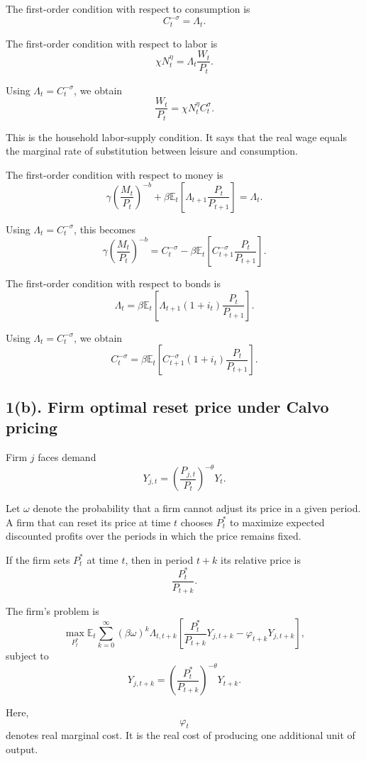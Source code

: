 \documentclass[12pt]{article}
\begin{document}
The first-order condition with respect to consumption is
\[
C_t^{-\sigma}=\Lambda_t.
\]

The first-order condition with respect to labor is
\[
\chi N_t^\eta
=
\Lambda_t\frac{W_t}{P_t}.
\]

Using $\Lambda_t=C_t^{-\sigma}$, we obtain
\[
\boxed{
\frac{W_t}{P_t}
=
\chi N_t^\eta C_t^\sigma.
}
\]

This is the household labor-supply condition. It says that the real wage equals the marginal rate of substitution between leisure and consumption.

The first-order condition with respect to money is
\[
\gamma
\left(
\frac{M_t}{P_t}
\right)^{-b}
+
\beta\mathbb{E}_t
\left[
\Lambda_{t+1}
\frac{P_t}{P_{t+1}}
\right]
=
\Lambda_t.
\]

Using $\Lambda_t=C_t^{-\sigma}$, this becomes
\[
\boxed{
\gamma
\left(
\frac{M_t}{P_t}
\right)^{-b}
=
C_t^{-\sigma}
-
\beta\mathbb{E}_t
\left[
C_{t+1}^{-\sigma}
\frac{P_t}{P_{t+1}}
\right].
}
\]

The first-order condition with respect to bonds is
\[
\Lambda_t
=
\beta\mathbb{E}_t
\left[
\Lambda_{t+1}
(1+i_t)
\frac{P_t}{P_{t+1}}
\right].
\]

Using $\Lambda_t=C_t^{-\sigma}$, we obtain
\[
\boxed{
C_t^{-\sigma}
=
\beta\mathbb{E}_t
\left[
C_{t+1}^{-\sigma}
(1+i_t)
\frac{P_t}{P_{t+1}}
\right].
}
\]

\subsection*{1(b). Firm optimal reset price under Calvo pricing}

Firm $j$ faces demand
\[
Y_{j,t}
=
\left(
\frac{P_{j,t}}{P_t}
\right)^{-\theta}
Y_t.
\]

Let $\omega$ denote the probability that a firm cannot adjust its price in a given period. A firm that can reset its price at time $t$ chooses $P_t^*$ to maximize expected discounted profits over the periods in which the price remains fixed.

If the firm sets $P_t^*$ at time $t$, then in period $t+k$ its relative price is
\[
\frac{P_t^*}{P_{t+k}}.
\]

The firm's problem is
\[
\max_{P_t^*}
\mathbb{E}_t
\sum_{k=0}^{\infty}
(\beta\omega)^k
\Lambda_{t,t+k}
\left[
\frac{P_t^*}{P_{t+k}}Y_{j,t+k}
-
\varphi_{t+k}Y_{j,t+k}
\right],
\]
subject to
\[
Y_{j,t+k}
=
\left(
\frac{P_t^*}{P_{t+k}}
\right)^{-\theta}
Y_{t+k}.
\]

Here,
\[
\varphi_t
\]
denotes real marginal cost. It is the real cost of producing one additional unit of output.
\end{document}
